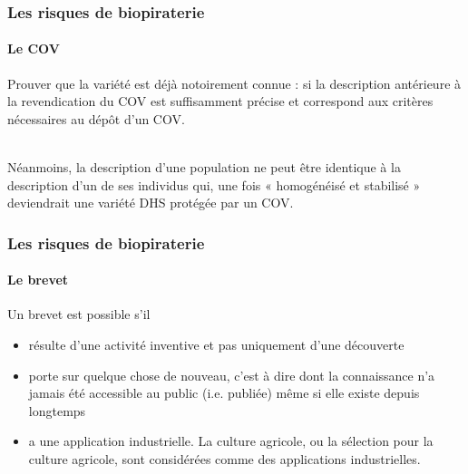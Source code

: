 \begin{frame} 
\frametitle{Les risques de biopiraterie}
\framesubtitle{Le COV}


Prouver que la variété est déjà notoirement connue : si la description antérieure à la revendication du COV est suffisamment précise et correspond aux critères nécessaires au dépôt d'un COV.

~\\

Néanmoins, la description d'une population ne peut être identique à la description d'un de ses individus qui, une fois « homogénéisé et stabilisé » deviendrait une variété DHS protégée par un COV. 

\end{frame}


\begin{frame}
\frametitle{Les risques de biopiraterie}
\framesubtitle{Le brevet}

Un brevet est possible s'il
\begin{itemize}
\item résulte d'une activité inventive et pas uniquement d'une découverte
\item porte sur quelque chose de nouveau, c'est à dire dont la connaissance n'a jamais été
accessible au public (i.e. publiée) même si elle existe depuis longtemps
\item a une application industrielle. La culture agricole, ou la sélection pour la culture agricole,
sont considérées comme des applications industrielles.
\end{itemize}

\end{frame}


